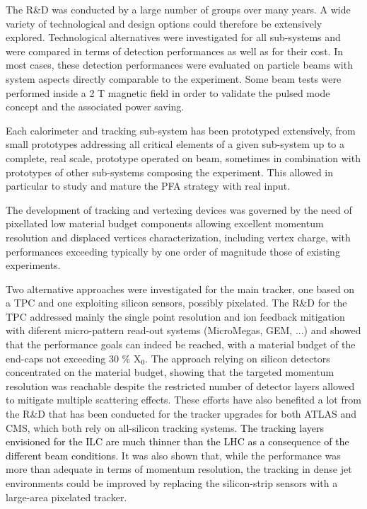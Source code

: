 \documentclass[%
 reprint,
 amsmath,amssymb,
 aps,
]{revtex4-1}
\newcommand{\jim}[1]{\textcolor{black}{#1}}
\begin{document}
The R\&D was conducted by a large number of groups over many years. A wide variety of technological and design options could therefore be extensively explored. Technological alternatives were investigated for all sub-systems and were compared in terms of detection performances as well as for their cost. In most cases, these detection performances were evaluated on particle beams with system aspects directly comparable to the experiment. Some beam tests were performed inside a 2 T magnetic field in order to validate the pulsed mode concept and the associated power saving.

Each calorimeter and tracking sub-system has been prototyped extensively, from small prototypes addressing all critical elements of a given sub-system up to a complete, real scale, prototype operated on beam, sometimes in combination with prototypes of other sub-systems composing the experiment. This allowed in particular to study and mature the PFA strategy with real input.

The development of tracking and vertexing devices was governed by the need of pixellated low material budget components allowing excellent momentum resolution and displaced vertices characterization, including vertex charge, with performances exceeding typically by one order of magnitude those of existing experiments.

Two alternative approaches were investigated for the main tracker, one based on a TPC and one exploiting silicon sensors, possibly pixelated. The R\&D for the TPC addressed mainly the single point resolution and ion feedback mitigation with diferent micro-pattern read-out systems (MicroMegas, GEM, ...) and showed that the performance goals can indeed be reached, with a material budget of the end-caps not exceeding 30 \% X\jim{$_0$}. The approach relying on silicon detectors concentrated on the material budget, showing that the targeted momentum resolution was reachable despite the restricted number of detector layers allowed to mitigate multiple scattering effects. These efforts have also benefited a lot from the R\&D that has been conducted for the tracker upgrades for both ATLAS and CMS, which both rely on all-silicon tracking systems. 
\jim{The tracking layers 
envisioned for the ILC are much thinner than the LHC as a consequence of the different beam conditions.}
It was also shown that, while the performance was more than adequate in terms of momentum resolution, the tracking in dense jet environments could be improved by replacing the silicon-strip sensors with a large-area pixelated tracker. 
\end{document}

